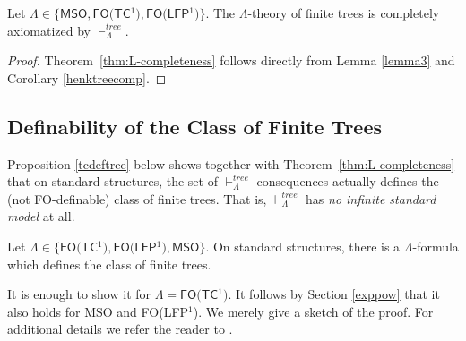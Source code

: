 \documentclass{LMCS}
\newcommand{\fo}{\textsf{FO}\xspace}
\newcommand{\mso}{\textsf{MSO}\xspace}
\newcommand{\fotc}{\textsf{FO(TC$^1$)}\xspace}
\newcommand{\folfp}{\textsf{FO(LFP$^1$)}\xspace}
\begin{document}
\begin{thm}\label{thm:L-completeness}
  Let $\Lambda \in \{\mso,\fotc,\folfp\}$. The $\Lambda$-theory of finite trees is completely axiomatized by $\vdash_\Lambda^{tree}$.
\end{thm}

\begin{proof}
Theorem~\ref{thm:L-completeness} follows directly from Lemma \ref{lemma3} and Corollary \ref{henktreecomp}.
\end{proof}

\subsection{Definability of the Class of Finite Trees}
\label{sec53}

Proposition \ref{tcdeftree} below shows together with Theorem~\ref{thm:L-completeness} that on standard structures, the set of $\vdash_\Lambda^{tree}$ consequences actually defines the (not \fo-definable) class of finite trees. That is, $\vdash_\Lambda^{tree}$ has \emph{no infinite standard model} at all.

\begin{prop}[\cite{2006}]
Let $\Lambda \in \{\fotc,\folfp,\mso\}$. On standard structures, there is a $\Lambda$-formula which defines the class of finite trees.
\label{tcdeftree}
\end{prop}
It is enough to show it for $\Lambda=\fotc$. It follows by Section \ref{exppow} that it also holds for \mso and \folfp.
We merely give a sketch of the proof. For additional details we
refer the reader to \cite{2006}. 
\end{document}
